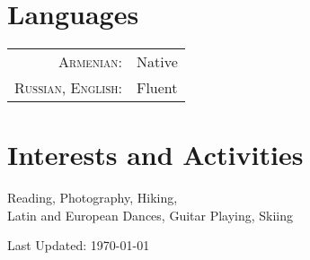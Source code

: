\documentclass[a4paper,10pt]{article}
\begin{document}
\section{Languages}
\begin{tabular}{rl}
 \textsc{Armenian:}&Native\\
 \textsc{Russian, English:}&Fluent\\
\end{tabular}

\section{Interests and Activities}
Reading, Photography, Hiking,  \\
Latin and European Dances, Guitar Playing, Skiing

\vfill
\hfill \footnotesize{Last Updated: \mydate\today }
\end{document}
